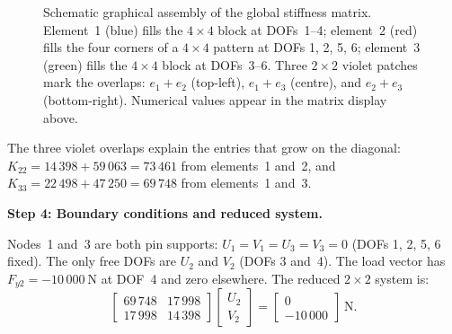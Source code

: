 \begin{example}
\begin{figure}[htbp]
\caption{Schematic graphical assembly of the global stiffness matrix.
Element~1 (blue) fills the $4{\times}4$ block at DOFs~1--4;
element~2 (red) fills the four corners of a $4{\times}4$ pattern at
DOFs 1, 2, 5, 6; element~3 (green) fills the $4{\times}4$ block at
DOFs~3--6. Three $2{\times}2$ violet patches mark the overlaps:
$e_1\!+\!e_2$ (top-left), $e_1\!+\!e_3$ (centre), and
$e_2\!+\!e_3$ (bottom-right). Numerical values appear in the matrix
display above.}
\label{fig:truss_K_assembly}
\end{figure}

The three violet overlaps explain the entries that grow on the diagonal:
$K_{22} = 14\,398 + 59\,063 = 73\,461$ from elements~1 and~2, and
$K_{33} = 22\,498 + 47\,250 = 69\,748$ from elements~1 and~3.

\medskip
\noindent\textbf{Step 4: Boundary conditions and reduced system.}

Nodes~1 and~3 are both pin supports: $U_1 = V_1 = U_3 = V_3 = 0$
(DOFs 1, 2, 5, 6 fixed). The only free DOFs are $U_2$ and $V_2$ (DOFs 3
and~4). The load vector has $F_{y2} = -10\,000\ \text{N}$ at DOF~4 and zero
elsewhere. The reduced $2\times2$ system is:
\begin{equation}
    \begin{bmatrix} 69\,748 & 17\,998 \\ 17\,998 & 14\,398 \end{bmatrix}
    \begin{bmatrix} U_2 \\ V_2 \end{bmatrix}
    = \begin{bmatrix} 0 \\ -10\,000 \end{bmatrix}\ \text{N} .
    \label{eq:truss_kred}
\end{equation}


\end{example}

